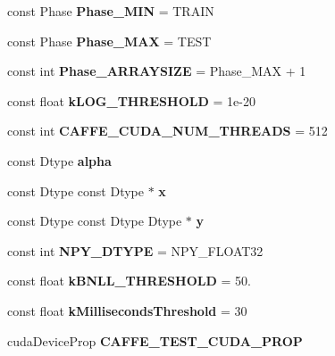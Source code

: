 \begin{DoxyCompactItemize}
const Phase {\bfseries Phase\+\_\+\+M\+IN} = T\+R\+A\+IN
\item 
\mbox{\label{namespacecaffe_a7074d9402e2fb9a89632d1fe920e2a78}} 
const Phase {\bfseries Phase\+\_\+\+M\+AX} = T\+E\+ST
\item 
\mbox{\label{namespacecaffe_a4b49f3052d79c8d07db325d48a0bf00a}} 
const int {\bfseries Phase\+\_\+\+A\+R\+R\+A\+Y\+S\+I\+ZE} = Phase\+\_\+\+M\+AX + 1
\item 
\mbox{\label{namespacecaffe_addfe87008440b3c5636d308f5189de6f}} 
const float {\bfseries k\+L\+O\+G\+\_\+\+T\+H\+R\+E\+S\+H\+O\+LD} = 1e-\/20
\item 
\mbox{\label{namespacecaffe_a10ad8f44dec37737a660d1d5439b9cca}} 
const int {\bfseries C\+A\+F\+F\+E\+\_\+\+C\+U\+D\+A\+\_\+\+N\+U\+M\+\_\+\+T\+H\+R\+E\+A\+DS} = 512
\item 
\mbox{\label{namespacecaffe_a32e3412526c6fa01d9ec08fc6866fb12}} 
const Dtype {\bfseries alpha}
\item 
\mbox{\label{namespacecaffe_ad2ed96e1320272778cc2afe4710d3d5b}} 
const Dtype const Dtype $\ast$ {\bfseries x}
\item 
\mbox{\label{namespacecaffe_a93d5236f1a5da9d7dda422be73afa59b}} 
const Dtype const Dtype Dtype $\ast$ {\bfseries y}
\item 
\mbox{\label{namespacecaffe_a4e8dda25623d5a67f23ae7d1467cc935}} 
const int {\bfseries N\+P\+Y\+\_\+\+D\+T\+Y\+PE} = N\+P\+Y\+\_\+\+F\+L\+O\+A\+T32
\item 
\mbox{\label{namespacecaffe_a01b89e7dac7d83e43840af4a4415589d}} 
const float {\bfseries k\+B\+N\+L\+L\+\_\+\+T\+H\+R\+E\+S\+H\+O\+LD} = 50.
\item 
\mbox{\label{namespacecaffe_a02a6b733dcfaf09258d92ba315e59a0e}} 
const float {\bfseries k\+Milliseconds\+Threshold} = 30
\item 
\mbox{\label{namespacecaffe_a52c3f55acde538ca266106c6bcf31159}} 
cuda\+Device\+Prop {\bfseries C\+A\+F\+F\+E\+\_\+\+T\+E\+S\+T\+\_\+\+C\+U\+D\+A\+\_\+\+P\+R\+OP}
\end{DoxyCompactItemize}


